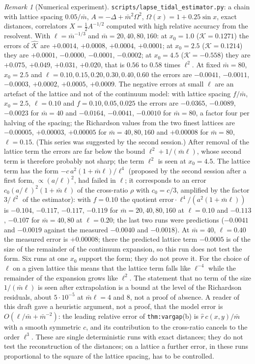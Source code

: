 \documentclass[a4paper,11pt]{article}
\theoremstyle{definition}
\theoremstyle{remark}
\newtheorem{remark}[theorem]{Remark}
\begin{document}
\begin{remark}[Numerical experiment]
\texttt{scripts/lapse\_tidal\_estimator.py}: a chain with lattice spacing $0.05/\bar m$, $A=-\Delta+\bar m^2\Omega^2$, $\Omega(x)=1+0.25\sin x$, exact distances, correlators $X=\tfrac12A^{-1/2}$ computed with high relative accuracy from the resolvent. With $\ell=\bar m^{-1/3}$ and $\bar m=20,40,80,160$: at $x_0=1.0$ ($\mathcal K=0.1271$) the errors of $\hat{\mathcal K}$ are $+0.0014$, $+0.0008$, $+0.0004$, $+0.0001$; at $x_0=2.5$ ($\mathcal K=0.1214$) they are $+0.0001$, $-0.0000$, $-0.0001$, $-0.0002$; at $x_0=4.5$ ($\mathcal K=-0.558$) they are $+0.075$, $+0.049$, $+0.031$, $+0.020$, that is $0.56$ to $0.58$ times $\ell^2$. At fixed $\bar m=80$, $x_0=2.5$ and $\ell=0.10,0.15,0.20,0.30,0.40,0.60$ the errors are $-0.0041$, $-0.0011$, $-0.0003$, $+0.0002$, $+0.0005$, $+0.0009$. The negative errors at small $\ell$ are an artefact of the lattice and not of the continuum model: with lattice spacing $f/\bar m$, $x_0=2.5$, $\ell=0.10$ and $f=0.10,0.05,0.025$ the errors are $-0.0365$, $-0.0089$, $-0.0023$ for $\bar m=40$ and $-0.0164$, $-0.0041$, $-0.0010$ for $\bar m=80$, a factor four per halving of the spacing; the Richardson values from the two finest lattices are $-0.00005$, $+0.00003$, $+0.00005$ for $\bar m=40,80,160$ and $+0.00008$ for $\bar m=80$, $\ell=0.15$. (This series was suggested by the second session.) After removal of the lattice term the errors are far below the bound $\ell^2+1/(\bar m\ell)$, whose second term is therefore probably not sharp; the term $\ell^2$ is seen at $x_0=4.5$. The lattice term has the form $-c\,a^2(1+\bar m\ell)/\ell^4$ (proposed by the second session after a first form, $\propto(a/\ell)^2$, had failed in $\ell$; it corresponds to an error $c_0(a/\ell)^2(1+\bar m\ell)$ of the cross-ratio $\rho$ with $c_0=c/3$, amplified by the factor $3/\ell^2$ of the estimator): with $f=0.10$ the quotient $\text{error}\cdot\ell^4/(a^2(1+\bar m\ell))$ is $-0.104$, $-0.117$, $-0.117$, $-0.119$ for $\bar m=20,40,80,160$ at $\ell=0.10$ and $-0.113$, $-0.107$ for $\bar m=40,80$ at $\ell=0.20$; the last two runs were predictions ($-0.0041$ and $-0.0019$ against the measured $-0.0040$ and $-0.0018$). At $\bar m=40$, $\ell=0.40$ the measured error is $+0.00008$; there the predicted lattice term $-0.0005$ is of the size of the remainder of the continuum expansion, so this run does not test the form. Six runs at one $x_0$ support the form; they do not prove it. For the choice of $\ell$ on a given lattice this means that the lattice term falls like $\ell^{-4}$ while the remainder of the expansion grows like $\ell^2$. The statement that no term of the size $1/(\bar m\ell)$ is seen after extrapolation is a bound at the level of the Richardson residuals, about $5\cdot10^{-5}$ at $\bar m\ell=4$ and $8$, not a proof of absence. A reader of this draft gave a heuristic argument, not a proof, that the model error is $O(\ell/\bar m+\bar m^{-2})$: the leading relative error of \texttt{thm:vargap}(b) is $\hat r\,c(x,y)/\bar m$ with a smooth symmetric $c$, and its contribution to the cross-ratio cancels to the order $\ell^3$. These are single deterministic runs with exact distances; they do not test the reconstruction of the distances; on a lattice a further error, in these runs proportional to the square of the lattice spacing, has to be controlled.

\end{remark}
\end{document}
